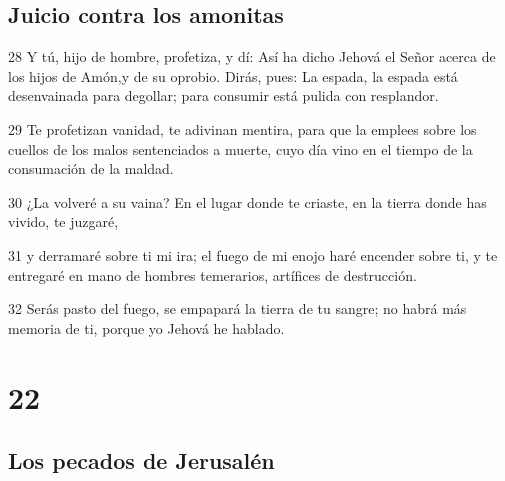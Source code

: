 \section*{Juicio contra los amonitas}

\par 28 Y tú, hijo de hombre, profetiza, y dí: Así ha dicho Jehová el Señor acerca de los hijos de Amón,y de su oprobio. Dirás, pues: La espada, la espada está desenvainada para degollar; para consumir está pulida con resplandor.
\par 29 Te profetizan vanidad, te adivinan mentira, para que la emplees sobre los cuellos de los malos sentenciados a muerte, cuyo día vino en el tiempo de la consumación de la maldad.
\par 30 ¿La volveré a su vaina? En el lugar donde te criaste, en la tierra donde has vivido, te juzgaré,
\par 31 y derramaré sobre ti mi ira; el fuego de mi enojo haré encender sobre ti, y te entregaré en mano de hombres temerarios, artífices de destrucción.
\par 32 Serás pasto del fuego, se empapará la tierra de tu sangre; no habrá más memoria de ti, porque yo Jehová he hablado.

\chapter{22}

\section*{Los pecados de Jerusalén}

